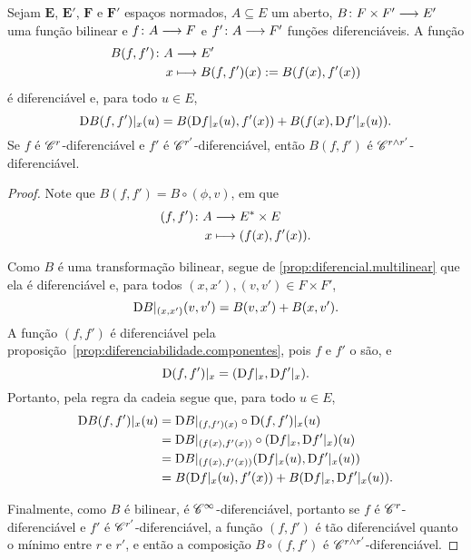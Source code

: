 \begin{proposition}
\label{prop:diferenciabilidade.avaliacao.bilinear}
Sejam $\bm E$, $\bm E'$, $\bm F$ e $\bm F'$ espaços normados, $A \subseteq E$ um aberto, $B\colon \allowbreak F \times F' \longrightarrow E'$ uma função bilinear e $f\colon \allowbreak A \longrightarrow F$ e $f'\colon \allowbreak A \longrightarrow F'$ funções diferenciáveis. A função
	\begin{align*}
	{B(f,f')}\colon {A} &\longrightarrow {E'} \\{x} &\longmapsto B(f,f')(x) := B(f(x),f'(x))
	\end{align*}
é diferenciável e, para todo $u \in E$,
	\begin{equation*}
	\mathrm{D} B(f,f')|_x(u) = B(\mathrm{D} f|_x(u),f'(x)) + B(f(x), \mathrm{D} f'|_x(u)).
	\end{equation*}
Se $f$ é $\mathscr{C}^r$-diferenciável e $f'$ é $\mathscr{C}^{r'}$-diferenciável, então $B(f,f')$ é $\mathscr{C}^{r \mathbin{\wedge} r'}$-diferenciável.
\end{proposition}
\begin{proof}
Note que $B(f,f') = B \circ (\phi,v)$, em que
	\begin{align*}
	{(f, f')}\colon {A} &\longrightarrow {E^{\ast}\times E} \\{x} &\longmapsto (f(x), f'(x)).
	\end{align*}

Como $B$ é uma transformação bilinear, segue de \ref{prop:diferencial.multilinear} que ela é diferenciável e, para todos $(x,x'), (v,v') \in F \times F'$,
	\begin{equation*}
	\mathrm{D} B|_{(x,x')}(v,v') = B(v,x') + B(x,v').
	\end{equation*}
A função $(f,f')$ é diferenciável pela proposição~\ref{prop:diferenciabilidade.componentes}, pois $f$ e $f'$ o são, e
	\begin{equation*}
	\mathrm{D} (f,f')|_x = (\mathrm{D} f|_x, \mathrm{D} f'|_x).
	\end{equation*}
Portanto, pela regra da cadeia segue que, para todo $u \in E$,
	\begin{align*}
	\mathrm{D} B(f,f')|_x(u) &= \mathrm{D} B|_{(f,f')(x)} \circ \mathrm{D} (f,f')|_x(u) \\
		&= \mathrm{D} B|_{(f(x),f'(x))} \circ (\mathrm{D} f|_x,\mathrm{D} f'|_x)(u) \\
		&= \mathrm{D} B|_{(f(x),f'(x))} (\mathrm{D} f|_x(u),\mathrm{D} f'|_x(u)) \\
		&= B(\mathrm{D} f|_x(u), f'(x)) + B(\mathrm{D} f|_x, \mathrm{D} f'|_x(u)).
	\end{align*}

Finalmente, como $B$ é bilinear, é $\mathscr{C}^\infty$-diferenciável, portanto se $f$ é $\mathscr{C}^r$-diferenciável e $f'$ é $\mathscr{C}^{r'}$-diferenciável, a função $(f,f')$ é tão diferenciável quanto o mínimo entre $r$ e $r'$, e então a composição $B \circ (f,f')$ é $\mathscr{C}^{r \mathbin{\wedge} r'}$-diferenciável.
\end{proof}








